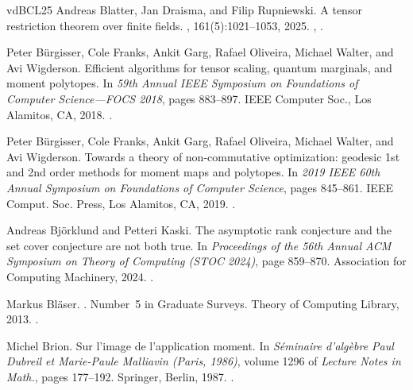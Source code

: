 \documentclass[11pt,letterpaper]{article}
\begin{document}
\begin{thebibliography}{vdBCL{\etalchar{+}}25}
Andreas Blatter, Jan Draisma, and Filip Rupniewski.
\newblock A tensor restriction theorem over finite fields.
, 161(5):1021--1053, 2025.
\newblock \href {https://arxiv.org/abs/2211.12319} {},
  \href {https://doi.org/10.1112/S0010437X25007067}
  {}.

Peter B\"{u}rgisser, Cole Franks, Ankit Garg, Rafael Oliveira, Michael Walter,
  and Avi Wigderson.
\newblock Efficient algorithms for tensor scaling, quantum marginals, and
  moment polytopes.
\newblock In {\em 59th {A}nnual {IEEE} {S}ymposium on {F}oundations of
  {C}omputer {S}cience---{FOCS} 2018}, pages 883--897. IEEE Computer Soc., Los
  Alamitos, CA, 2018.
\newblock \href {https://doi.org/10.1109/FOCS.2018.00088}
  {}.

Peter B\"{u}rgisser, Cole Franks, Ankit Garg, Rafael Oliveira, Michael Walter,
  and Avi Wigderson.
\newblock Towards a theory of non-commutative optimization: geodesic 1st and
  2nd order methods for moment maps and polytopes.
\newblock In {\em 2019 {IEEE} 60th {A}nnual {S}ymposium on {F}oundations of
  {C}omputer {S}cience}, pages 845--861. IEEE Comput. Soc. Press, Los Alamitos,
  CA, 2019.
\newblock \href {https://doi.org/10.1109/FOCS.2019.00055}
  {}.

Andreas Bj\"{o}rklund and Petteri Kaski.
\newblock The asymptotic rank conjecture and the set cover conjecture are not
  both true.
\newblock In {\em Proceedings of the 56th Annual ACM Symposium on Theory of
  Computing (STOC 2024)}, page 859–870. Association for Computing Machinery,
  2024.
\newblock \href {https://doi.org/10.1145/3618260.3649656}
  {}.

Markus Bl{\"a}ser.
.
\newblock Number~5 in Graduate Surveys. Theory of Computing Library, 2013.
\newblock \href {https://doi.org/10.4086/toc.gs.2013.005}
  {}.

Michel Brion.
\newblock Sur l'image de l'application moment.
\newblock In {\em S\'{e}minaire d'alg\`ebre {P}aul {D}ubreil et {M}arie-{P}aule
  {M}alliavin ({P}aris, 1986)}, volume 1296 of {\em Lecture Notes in Math.},
  pages 177--192. Springer, Berlin, 1987.
\newblock \href {https://doi.org/10.1007/BFb0078526}
  {}.


\end{thebibliography}
\end{document}
